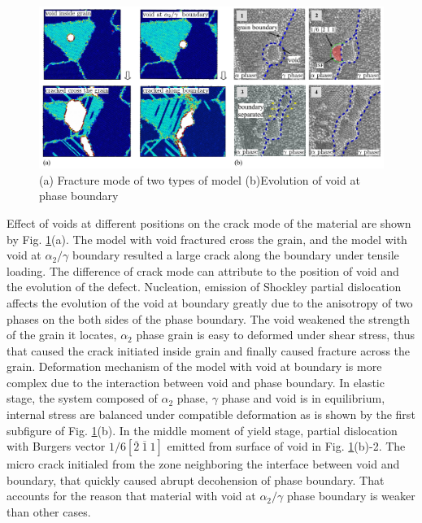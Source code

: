 \documentclass[Unknown,article,submit,moreauthors,pdftex,10pt,a4paper]{Definitions/mdpi}
\begin{document}
\begin{figure}[ht]
	\centering
	\includegraphics[width=1\linewidth]{"img/void-gb"}
	\caption{(a) Fracture mode of two types of model  (b)Evolution of void at  phase boundary}
	\label{fig:void-gb}
\end{figure}
Effect of voids at different positions on the crack mode of the material are shown by Fig. \ref{fig:void-gb}(a). The model with void fractured cross the grain, and the model with void at $\alpha_2 / \gamma$ boundary resulted a large crack along the boundary under tensile loading. The difference of crack mode can attribute to the position of void and the evolution of the defect. Nucleation, emission of Shockley partial dislocation affects the evolution of the void at boundary greatly due to the anisotropy of two phases on the both sides of the phase boundary. The void weakened the strength of the grain it locates, $\alpha_2$ phase grain is easy to deformed under shear stress, thus that caused the crack initiated inside grain and finally caused fracture across the grain. Deformation mechanism of the model with void at boundary is more complex due to the interaction between void and phase boundary. In elastic stage, the system composed of $\alpha_2$ phase, $\gamma$ phase and void is in equilibrium, internal stress are balanced under compatible deformation as is shown by the first subfigure of Fig. \ref{fig:void-gb}(b). In the middle moment of yield stage, partial dislocation with Burgers vector $1/6[\overline{2}\ \overline{1}\ 1]$ emitted from surface of void in Fig. \ref{fig:void-gb}(b)-2. The micro crack initialed from the zone neighboring the interface between void and boundary, that quickly caused abrupt decohension of phase boundary. That accounts for the reason that material with void at $\alpha_2 / \gamma$ phase boundary is weaker than other cases. 
\end{document}
